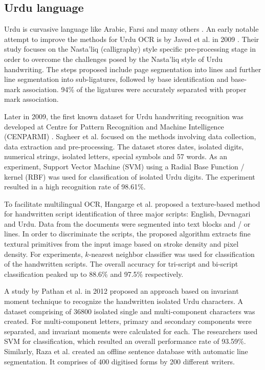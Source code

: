 \documentclass{article}
\begin{document}
\subsection{Urdu language}

Urdu is curvasive language like Arabic, Farsi and many others \cite{naz2014optical}.  An early notable attempt to improve the methods for Urdu OCR is by Javed et al. in 2009 \cite{javed2009improving}. Their study focuses on the Nasta'liq (calligraphy) style specific pre-processing stage in order to overcome the challenges posed by the Nasta'liq style of Urdu handwriting. The steps proposed include page segmentation into lines and further line segmentation into sub-ligatures, followed by base identification and base-mark association. 94\% of the ligatures were accurately separated with proper mark association. 

Later in 2009, the first known dataset for Urdu handwriting recognition was developed at Centre for Pattern Recognition and Machine Intelligence (CENPARMI) \cite{sagheer2009new}. Sagheer et al. \cite{sagheer2009new} focused on the methods involving data collection, data extraction and pre-processing. The dataset stores dates, isolated digits, numerical strings, isolated letters, special symbols and 57 words. As an experiment, Support Vector Machine (SVM) using a Radial Base Function / kernel (RBF) was used for classification of isolated Urdu digits. The experiment resulted in a high recognition rate of 98.61\%.


To facilitate multilingual OCR, Hangarge et al. \cite{hangarge2010offline} proposed a texture-based method for handwritten script identification of three major scripts: English, Devnagari and Urdu. Data from the documents were segmented into text blocks and / or lines. In order to discriminate the scripts, the proposed algorithm extracts fine textural primitives from the input image based on stroke density and pixel density. For experiments, $k$-nearest neighbor classifier was used for classification of the handwritten scripts. The overall accuracy for tri-script and bi-script classification peaked up to 88.6\% and 97.5\% respectively. 


A study by Pathan et al. \cite{pathan2012recognition} in 2012 proposed an approach based on invariant moment technique to recognize the handwritten isolated Urdu characters. A dataset comprising of 36800 isolated single and multi-component characters was created. For multi-component letters, primary and secondary components were separated, and invariant moments were calculated for each. The researchers used SVM for classification, which resulted an overall performance rate of 93.59\%. Similarly, Raza et al. \cite{raza2012unconstrained} created an offline sentence database  with automatic line segmentation. It comprises of 400 digitised forms by 200 different writers. 
\end{document}

